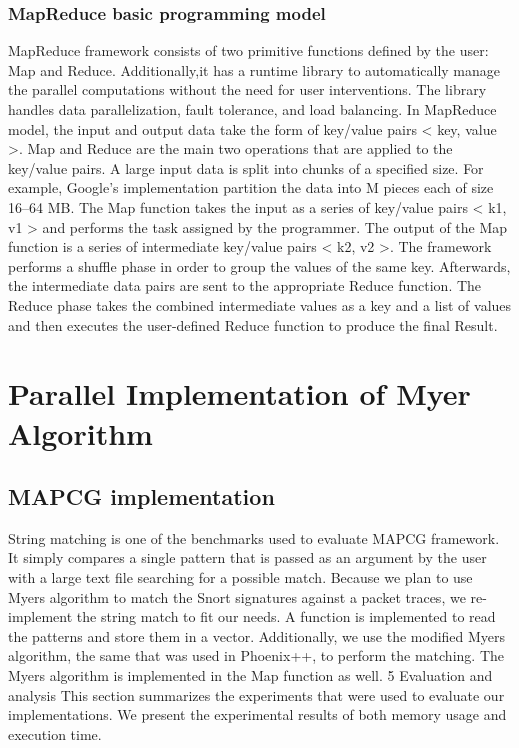 \documentclass[12pt,a4paper]{report}
\begin{document}
\subsubsection{MapReduce basic programming model}
MapReduce framework consists of two primitive functions
defined by the user: Map and Reduce. Additionally,it has a runtime library to automatically manage the parallel
computations without the need for user interventions.
The library handles data parallelization, fault tolerance,
and load balancing.
In MapReduce model, the input and output data take
the form of key/value pairs < key, value >. Map and
Reduce are the main two operations that are applied to
the key/value pairs. A large input data is split into chunks
of a specified size. For example, Google’s implementation
partition the data into M pieces each of size 16–64 MB.
The Map function takes the input as a series of key/value
pairs < k1, v1 > and performs the task assigned by the
programmer. The output of the Map function is a series of
intermediate key/value pairs < k2, v2 >.
The framework performs a shuffle phase in order to
group the values of the same key. Afterwards, the intermediate
data pairs are sent to the appropriate Reduce
function. The Reduce phase takes the combined intermediate
values as a key and a list of values and then executes
the user-defined Reduce function to produce the final
Result.
\section{Parallel Implementation of Myer Algorithm}
\subsection{MAPCG implementation}
String matching is one of the benchmarks used to evaluate
MAPCG framework. It simply compares a single pattern
that is passed as an argument by the user with a large text
file searching for a possible match. Because we plan to use
Myers algorithm to match the Snort signatures against a
packet traces, we re-implement the string match to fit our
needs.
A function is implemented to read the patterns and store
them in a vector. Additionally, we use the modified Myers
algorithm, the same that was used in Phoenix++, to perform
the matching. The Myers algorithm is implemented
in the Map function as well.
5 Evaluation and analysis
This section summarizes the experiments that were used
to evaluate our implementations. We present the experimental
results of both memory usage and execution time.
\end{document}
